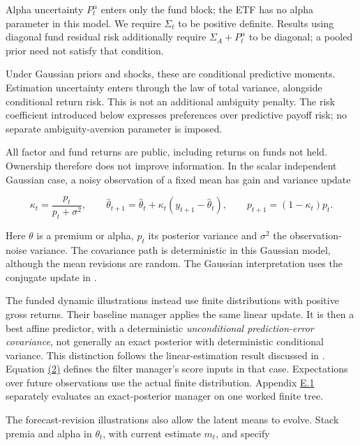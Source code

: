 \documentclass[11pt]{article}
\begin{document}
Alpha uncertainty \(P^\alpha_t\) enters only the fund block; the ETF has no alpha parameter in this model. We require \(\Sigma_t\) to be positive definite. Results using diagonal fund residual risk additionally require \(\Sigma_A+P^\alpha_t\) to be diagonal; a pooled prior need not satisfy that condition.

Under Gaussian priors and shocks, these are conditional predictive moments. Estimation uncertainty enters through the law of total variance, alongside conditional return risk. This is not an additional ambiguity penalty. The risk coefficient introduced below expresses preferences over predictive payoff risk; no separate ambiguity-aversion parameter is imposed.

All factor and fund returns are public, including returns on funds not held. Ownership therefore does not improve information. In the scalar independent Gaussian case, a noisy observation of a fixed mean has gain and variance update

\begin{equation*}
\kappa_t=\frac{p_t}{p_t+\sigma^2},\qquad
\hat\theta_{t+1}=\hat\theta_t+\kappa_t(y_{t+1}-\hat\theta_t),\qquad
p_{t+1}=(1-\kappa_t)p_t.
\tag{3}\label{eq:3}
\end{equation*}

Here \(\theta\) is a premium or alpha, \(p_t\) its posterior variance and \(\sigma^2\) the observation-noise variance. The covariance path is deterministic in this Gaussian model, although the mean revisions are random. The Gaussian interpretation uses the conjugate update in \cite{murphy2007conjugate}.

The funded dynamic illustrations instead use finite distributions with positive gross returns. Their baseline manager applies the same linear update. It is then a best affine predictor, with a deterministic \emph{unconditional prediction-error covariance}, not generally an exact posterior with deterministic conditional variance. This distinction follows the linear-estimation result discussed in \cite{uhlmann2022gaussianity}. Equation \hyperref[eq:2]{(2)} defines the filter manager's score inputs in that case. Expectations over future observations use the actual finite distribution. Appendix \hyperref[sec:E.1]{E.1} separately evaluates an exact-posterior manager on one worked finite tree.

The forecast-revision illustrations also allow the latent means to evolve. Stack premia and alpha in \(\theta_t\), with current estimate \(m_t\), and specify
\end{document}
